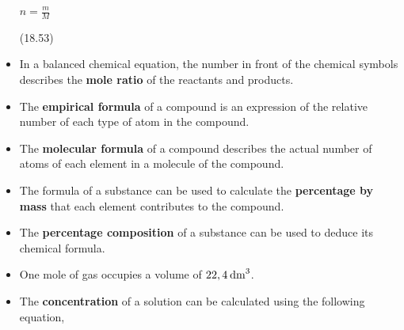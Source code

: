 \begin{itemize}[noitemsep]
{\begin{minipage}{\columnwidth}
    \parbox[t]{\mymathboxwidth}{\large\begin{math}
    n=\frac{m}{M}\end{math}}\hfill
    \parbox[t]{48pt}{\raggedleft 
    (18.53)}
    \end{minipage}\vspace{12pt}\par
    }%
    \label{m38712*uid112}\item In a balanced chemical equation, the number in front of the chemical symbols describes the \textbf{mole ratio} of the reactants and products.
\label{m38712*uid113}\item The \textbf{empirical formula} of a compound is an expression of the relative number of each type of atom in the compound.
\label{m38712*uid114}\item The \textbf{molecular formula} of a compound describes the actual number of atoms of each element in a molecule of the compound.
\label{m38712*uid115}\item The formula of a substance can be used to calculate the \textbf{percentage by mass} that each element contributes to the compound.
\label{m38712*uid116}\item The \textbf{percentage composition} of a substance can be used to deduce its chemical formula.
\label{m38712*uid117}\item One mole of gas occupies a volume of \begin{math}22,4\phantom{\rule{2pt}{0ex}}{\mathrm{dm}}^{3}\end{math}.
\label{m38712*uid118}\item The \textbf{concentration} of a solution can be calculated using the following equation,
\label{m38712*id286019}\nopagebreak\noindent{}
    

\end{itemize}
